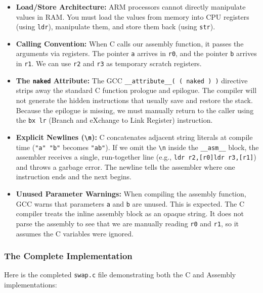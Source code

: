 \begin{itemize}
    \item \textbf{Load/Store Architecture:} ARM processors cannot directly manipulate values in RAM. You must load the values from memory into CPU registers (using \texttt{ldr}), manipulate them, and store them back (using \texttt{str}).
    \item \textbf{Calling Convention:} When C calls our assembly function, it passes the arguments via registers. The pointer \texttt{a} arrives in \texttt{r0}, and the pointer \texttt{b} arrives in \texttt{r1}. We can use \texttt{r2} and \texttt{r3} as temporary scratch registers.
    \item \textbf{The \texttt{naked} Attribute:} The GCC \texttt{\_\_attribute\_\_( ( naked ) )} directive strips away the standard C function prologue and epilogue. The compiler will not generate the hidden instructions that usually save and restore the stack. Because the epilogue is missing, we must manually return to the caller using the \texttt{bx lr} (Branch and eXchange to Link Register) instruction.
    \item \textbf{Explicit Newlines (\texttt{\textbackslash{}n}):} C concatenates adjacent string literals at compile time (\texttt{"a" "b"} becomes \texttt{"ab"}). If we omit the \texttt{\textbackslash{}n} inside the \texttt{\_\_asm\_\_} block, the assembler receives a single, run-together line (e.g., \texttt{ldr r2,[r0]ldr r3,[r1]}) and throws a garbage error. The newline tells the assembler where one instruction ends and the next begins.
    \item \textbf{Unused Parameter Warnings:} When compiling the assembly function, GCC warns that parameters \texttt{a} and \texttt{b} are unused. This is expected. The C compiler treats the inline assembly block as an opaque string. It does not parse the assembly to see that we are manually reading \texttt{r0} and \texttt{r1}, so it assumes the C variables were ignored.
\end{itemize}

\subsubsection{The Complete Implementation}
Here is the completed \texttt{swap.c} file demonstrating both the C and Assembly implementations:

